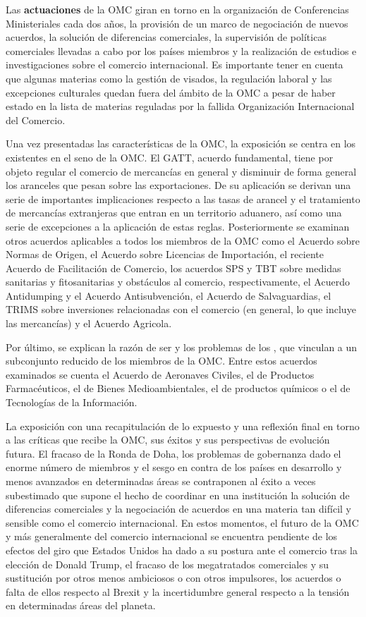 \documentclass{nuevotema}
\begin{document}
Las \textbf{actuaciones} de la OMC giran en torno en la organización de Conferencias Ministeriales cada dos años, la provisión de un marco de negociación de nuevos acuerdos, la solución de diferencias comerciales, la supervisión de políticas comerciales llevadas a cabo por los países miembros y la realización de estudios e investigaciones sobre el comercio internacional. Es importante tener en cuenta que algunas materias como la gestión de visados, la regulación laboral y las excepciones culturales quedan fuera del ámbito de la OMC a pesar de haber estado en la lista de materias reguladas por la fallida Organización Internacional del Comercio. 

Una vez presentadas las características de la OMC, la exposición se centra en los  existentes en el seno de la OMC. El GATT, acuerdo fundamental, tiene por objeto regular el comercio de mercancías en general y disminuir de forma general los aranceles que pesan sobre las exportaciones. De su aplicación se derivan una serie de importantes implicaciones respecto a las tasas de arancel y el tratamiento de mercancías extranjeras que entran en un territorio aduanero, así como una serie de excepciones a la aplicación de estas reglas. Posteriormente se examinan otros acuerdos aplicables a todos los miembros de la OMC como el Acuerdo sobre Normas de Origen, el Acuerdo sobre Licencias de Importación, el reciente Acuerdo de Facilitación de Comercio, los acuerdos SPS y TBT sobre medidas sanitarias y fitosanitarias y obstáculos al comercio, respectivamente, el Acuerdo Antidumping y el Acuerdo Antisubvención, el Acuerdo de Salvaguardias, el TRIMS sobre inversiones relacionadas con el comercio (en general, lo que incluye las mercancías) y el Acuerdo Agricola.

Por último, se explican la razón de ser y los problemas de los , que vinculan a un subconjunto reducido de los miembros de la OMC. Entre estos acuerdos examinados se cuenta el Acuerdo de Aeronaves Civiles, el de Productos Farmacéuticos, el de Bienes Medioambientales, el de productos químicos o el de Tecnologías de la Información.

La exposición  con una recapitulación de lo expuesto y una reflexión final en torno a las críticas que recibe la OMC, sus éxitos y sus perspectivas de evolución futura. El fracaso de la Ronda de Doha, los problemas de gobernanza dado el enorme número de miembros y el sesgo en contra de los países en desarrollo y menos avanzados en determinadas áreas se contraponen al éxito a veces subestimado que supone el hecho de coordinar en una institución la solución de diferencias comerciales y la negociación de acuerdos en una materia tan difícil y sensible como el comercio internacional. En estos momentos, el futuro de la OMC y más generalmente del comercio internacional se encuentra pendiente de los efectos del giro que Estados Unidos ha dado a su postura ante el comercio tras la elección de Donald Trump, el fracaso de los megatratados comerciales y su sustitución por otros menos ambiciosos o con otros impulsores, los acuerdos o falta de ellos respecto al Brexit y la incertidumbre general respecto a la tensión en determinadas áreas del planeta.
\end{document}
